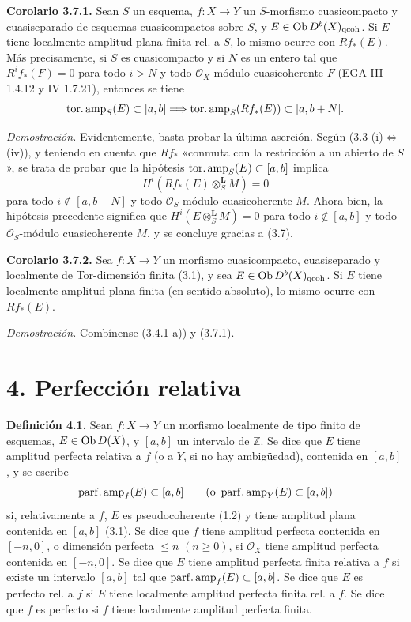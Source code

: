 \providecommand{\sisi}[2]{#2}

\textbf{Corolario 3.7.1.} Sean \(S\) un esquema, \(f:X\to Y\) un \(S\)-morfismo cuasicompacto y cuasiseparado de esquemas cuasicompactos sobre \(S\), y \(E\in\operatorname{Ob} D^b(X)_{\mathrm{qcoh}}\). Si \(E\) tiene localmente amplitud plana finita rel. a \(S\), lo mismo ocurre con \(Rf_*(E)\). Más precisamente, si \(S\) es cuasicompacto y si \(N\) es un entero tal que \(R^if_*(F)=0\) para todo \(i>N\) y todo \(\mathcal O_X\)-módulo cuasicoherente \(F\) (EGA III 1.4.12 y IV 1.7.21), entonces se tiene
\[
 \operatorname{tor.amp}_S(E)\subset[a,b]
 \Longrightarrow
 \operatorname{tor.amp}_S(Rf_*(E))
 \subset[a,b+N].
\]

\emph{Demostración.} Evidentemente, basta probar la última aserción. Según (3.3 (i)\(\Longleftrightarrow\)(iv)), y teniendo en cuenta que \(Rf_*\) «conmuta con la restricción a un abierto de \(S\)», se trata de probar que la hipótesis \(\operatorname{tor.amp}_S(E)\subset[a,b]\) implica
\[
 H^i(Rf_*(E)\otimes_S^{\mathbf L}M)=0
\]
para todo \(i\notin[a,b+N]\) y todo \(\mathcal O_S\)-módulo cuasicoherente \(M\). Ahora bien, la hipótesis precedente significa que \(H^i(E\otimes_S^{\mathbf L}M)=0\) para todo \(i\notin[a,b]\) y todo \(\mathcal O_S\)-módulo cuasicoherente \(M\), y se concluye gracias a (3.7).

\textbf{Corolario 3.7.2.} Sea \(f:X\to Y\) un morfismo cuasicompacto, cuasiseparado y localmente de Tor-dimensión finita (3.1), y sea \(E\in\operatorname{Ob} D^b(X)_{\mathrm{qcoh}}\). Si \(E\) tiene localmente amplitud plana finita (en sentido absoluto), lo mismo ocurre con \(Rf_*(E)\).

\emph{Demostración.} Combínense (3.4.1 a)) y (3.7.1).

\section*{4. Perfección relativa}

\textbf{Definición 4.1.} Sean \(f:X\to Y\) un morfismo localmente de tipo finito de esquemas, \(E\in\operatorname{Ob} D(X)\), y \([a,b]\) un intervalo de \(\mathbb Z\). Se dice que \(E\) tiene amplitud perfecta relativa a \(f\) (o a \(Y\), si no hay ambigüedad), contenida en \([a,b]\), y se escribe
\[
 \operatorname{parf.amp}_f(E)\subset[a,b]\qquad(\text{o }\operatorname{parf.amp}_Y(E)\subset[a,b])
\]
si, relativamente a \(f\), \(E\) es pseudocoherente (1.2) y tiene amplitud plana contenida en \([a,b]\) (3.1). Se dice que \(f\) tiene amplitud perfecta contenida en \([-n,0]\), o dimensión perfecta \(\leq n\) \((n\geq0)\), si \(\mathcal O_X\) tiene amplitud perfecta contenida en \([-n,0]\). Se dice que \(E\) tiene amplitud perfecta finita relativa a \(f\) si existe un intervalo \([a,b]\) tal que \(\operatorname{parf.amp}_f(E)\subset[a,b]\). Se dice que \(E\) es perfecto rel. a \(f\) si \(E\) tiene localmente amplitud perfecta finita rel. a \(f\). Se dice que \(f\) es perfecto si \(f\) tiene localmente amplitud perfecta finita.

